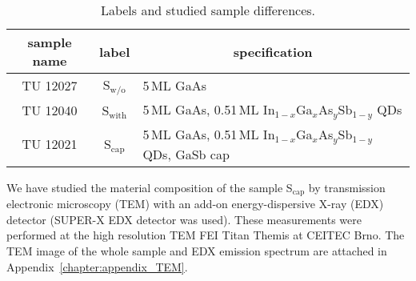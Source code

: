 \begin{table}
	\centering
	\caption{Labels and studied sample differences.}
	\begin{tabularx}{0.95\textwidth}{ccl}
		\toprule

		sample name & label& \multicolumn{1}{c}{specification}\\ 		
		\midrule
		\midrule
		TU 12027& S$_\mathrm{w/o}$ & 5$\,$ML GaAs\\
		TU 12040& S$_\mathrm{with}$ & 5$\,$ML GaAs, 0.51$\,$ML In$_{1-x}$Ga$_{x}$As$_y$Sb$_{1-y}$ QDs\\
		TU 12021 & S$_\mathrm{cap}$ & 5$\,$ML GaAs, 0.51$\,$ML In$_{1-x}$Ga$_{x}$As$_y$Sb$_{1-y}$ QDs, GaSb cap\\
		\bottomrule
	\end{tabularx}\label{tab:samples}
\end{table}



We have studied the material composition of the sample S$_\mathrm{cap}$ by transmission electronic microscopy (TEM) with an add-on energy-dispersive X-ray (EDX) detector (SUPER-X EDX detector was used). These measurements were performed at the high resolution TEM FEI Titan Themis at CEITEC Brno. The TEM image of the whole sample and EDX emission spectrum are attached in Appendix~\ref{chapter:appendix_TEM}.

